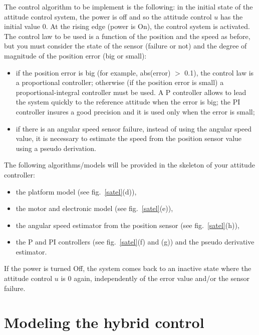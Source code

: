 \documentclass[a4paper]{article}
\begin{document}
The control algorithm to be implement is the following: in the initial state of the attitude 
control system, the power is off and so the attitude control 
$u$ has the initial value $0$. At the rising edge (power is On), the control system is activated. 
The control law to be used is a function of the position and the speed as before, but you must 
consider the state of the sensor (failure or not) and the degree of magnitude of the position 
error (big or small):
\begin{itemize}
\item if the position error is big (for example, abs(error) $>$ 0.1), the control law is a
proportional controller; otherwise (if the position error is small) a proportional-integral 
controller must be used. A P controller allows to lead the system quickly to the reference attitude 
when the error is big; the PI controller insures a good precision and it is used only when the 
error is small;
\item if there is an angular speed sensor failure, instead of using the angular speed value, it is 
necessary to estimate the speed from the position sensor value using a pseudo derivation.
\end{itemize}

The following algorithms/models will be provided in the skeleton of your attitude controller:
\begin{itemize}
\item the platform model (see fig.~\ref{satel}(d)),   
\item the motor and electronic model (see fig.~\ref{satel}(e)),
\item the angular speed estimator from the position sensor (see fig.~\ref{satel}(h)),
\item the P and PI controllers (see fig.~\ref{satel}(f) and (g)) and 
	the pseudo derivative estimator.
\end{itemize}

If the power is turned Off, the system comes back to an inactive state where the attitude 
control $u$ is $0$ again, independently of the error value and/or the sensor failure.

\section{Modeling the hybrid control}
\end{document}
